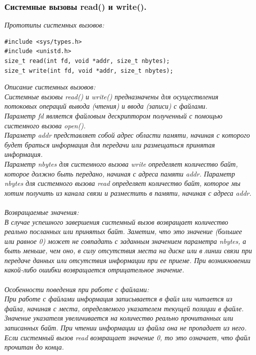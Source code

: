 \documentclass[a4paper]{article}
\begin{document}
\subsubsection{\Large Системные вызовы read() и write().}
\sl Прототипы системных вызовов:
\begin{verbatim}
#include <sys/types.h>
#include <unistd.h>
size_t read(int fd, void *addr, size_t nbytes);
size_t write(int fd, void *addr, size_t nbytes);
\end{verbatim}

\sl Описание системных вызовов: \\

\rm Системные вызовы read() и write() предназначены для осуществления потоковых операций вывода (чтения) и ввода (записи) с файлами. \\
Параметр \sl fd \rm является файловым дескриптором полученный с помощью системного вызова open().\\
Параметр \sl addr \rm представляет собой адрес области памяти, начиная с которого будет браться информация для передачи или размещаться принятая информация. \\
Параметр \sl nbytes \rm для системного вызова write определяет количество байт, которое должно быть передано, начиная с адреса памяти addr. Параметр nbytes для системного вызова read определяет количество байт, которое мы хотим получить из канала связи и разместить в памяти, начиная с адреса addr.\\\\
\sl Возвращаемые значения:\\
\rm В случае успешного завершения системный вызов возвращает количество реально посланных или принятых байт. Заметим, что это значение (большее или равное 0) может не совпадать с заданным значением параметра nbytes, а быть меньше, чем оно, в силу отсутствия места на диске или в линии связи при передаче данных или отсутствия информации при ее приеме. При возникновении какой-либо ошибки возвращается отрицательное значение.\\\\
\noindent
\sl Особенности поведения при работе с файлами:\\
\rm При работе с файлами информация записывается в файл или читается из файла, начиная с места, определяемого указателем текущей позиции в файле. Значение указателя увеличивается на количество реально прочитанных или записанных байт. При чтении информации из файла она не пропадает из него. Если системный вызов read возвращает значение 0, то это означает, что файл прочитан до конца.\\\\
\end{document}
